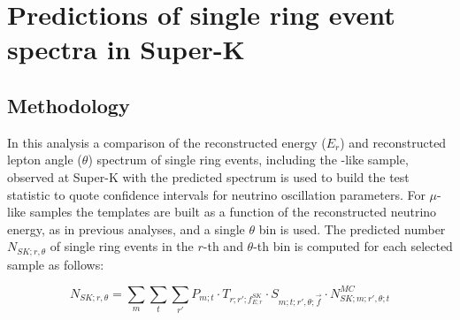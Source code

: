 \clearpage

\section {Predictions of single ring event spectra in Super-K}
\label{sec:spectrum_prediction}

\subsection {Methodology}

In this analysis a comparison of 
the reconstructed energy ($E_{r}$) and reconstructed lepton angle ($\theta$) spectrum
of single ring events, including the \nueCConepi{}-like sample, observed at Super-K with the predicted spectrum
is used to build the test statistic to quote confidence intervals for neutrino oscillation parameters.
For $\mu$-like samples the templates are built as a function of the reconstructed neutrino energy,
as in previous analyses, and a single $\theta$ bin is used.
The predicted number $N_{SK;r,\theta}$ 
of single ring events in the $r$-th and $\theta$-th bin
is computed for each selected sample as follows:

\begin{equation}
\displaystyle
  N_{SK;r,\theta} = 
    \sum_{m} \sum_{t} \sum_{r\prime}
        P_{m;t} \cdot
        T_{r;r\prime;f_{E; r}^{SK}} \cdot
        S_{m;t;r\prime,\theta;\vec{f}} \cdot
        N_{SK;m;r\prime,\theta;t}^{MC} 
         \label{eq:far_prediction}
\end{equation}

